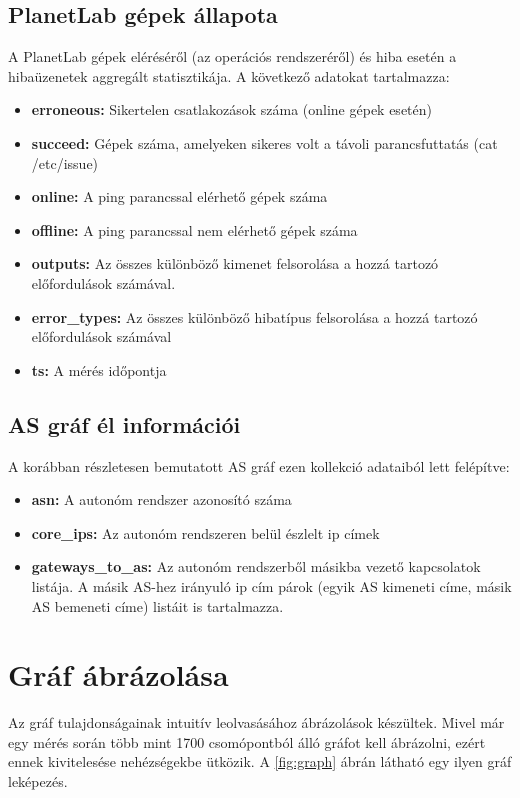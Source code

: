 \subsection*{PlanetLab gépek állapota}
A PlanetLab gépek eléréséről (az operációs rendszeréről) és hiba esetén a hibaüzenetek aggregált statisztikája. A következő adatokat tartalmazza:

\begin{itemize}
\item \textbf{erroneous:} Sikertelen csatlakozások száma (online gépek esetén)
\item \textbf{succeed:} Gépek száma, amelyeken sikeres volt a távoli parancsfuttatás (cat /etc/issue)
\item \textbf{online:} A ping parancssal elérhető gépek száma
\item \textbf{offline:} A ping parancssal nem elérhető gépek száma
\item \textbf{outputs:} Az összes különböző kimenet felsorolása a hozzá tartozó előfordulások számával.
\item \textbf{error\_types:} Az összes különböző hibatípus felsorolása a hozzá tartozó előfordulások számával
\item \textbf{ts:} A mérés időpontja
\end{itemize}

\subsection*{AS gráf él információi}
A korábban részletesen bemutatott AS gráf ezen kollekció adataiból lett felépítve:

\begin{itemize}
\item \textbf{asn:} A autonóm rendszer azonosító száma
\item \textbf{core\_ips:} Az autonóm rendszeren belül észlelt ip címek
\item \textbf{gateways\_to\_as:} Az autonóm rendszerből másikba vezető kapcsolatok listája. A másik AS-hez irányuló ip cím párok (egyik AS kimeneti címe, másik AS bemeneti címe) listáit is tartalmazza.
\end{itemize}


\section{Gráf ábrázolása}

Az gráf tulajdonságainak intuitív leolvasásához ábrázolások készültek. Mivel már egy mérés során több mint 1700 csomópontból álló gráfot kell ábrázolni, ezért ennek kivitelesése nehézségekbe ütközik. A \ref{fig:graph} ábrán látható egy ilyen gráf leképezés.

